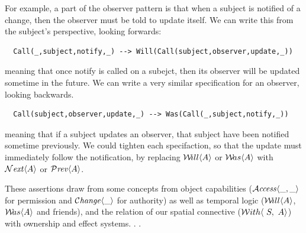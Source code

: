 For example, a part of the observer pattern is that when
a subject is notified of a change, then the observer must
be told to update itself.    We can write this from the
subject's perspective, looking forwards:

\begin{lstlisting}
  Call(_,subject,notify,_) --> Will(Call(subject,observer,update,_))
\end{lstlisting}

\noindent meaning that once notify is called on a subejct, then its
observer will be updated sometime in the future.  We can write a very
similar specification for an observer, looking backwards.

\begin{lstlisting}
  Call(subject,observer,update,_) --> Was(Call(_,subject,notify,_))
\end{lstlisting}

\noindent meaning that if a subject updates an observer, that subject
have been notified sometime previously. We could tighten each
specifaction, so that the update must immediately follow the
notification, by replacing ${{\mathcal W}\!ill}\langle A\rangle$ or ${{\mathcal W}\!as}\langle A\rangle$ with 
${\mathcal{N}}\textrm{\textit{ext}}\langle A\rangle$ or ${\mathcal{P}}\textrm{\textit{rev}}\langle A\rangle$.

{}

 
%
%
These assertions draw from some concepts from object capabilities
(${\mathcal{A}}\textrm{\textit{ccess}}\langle \_,\_\rangle$  for  permission and $\mathcal{C}\textrm{\textit{hange}}\langle\_\rangle$ for
authority) 
as well as temporal logic (${{\mathcal W}\!ill}\langle A\rangle$, ${{\mathcal W}\!as}\langle A\rangle$ and friends), and the relation of
our spatial connective (${\mathcal W}ith\langle\ S,\ A\rangle$)  with ownership and effect
systems.
{}. 
{}  
%
{}.


